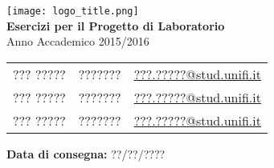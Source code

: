 \begin{center}
   	\texttt{[image: logo\_title.png]}\\[0.8cm]
    {\huge\bfseries Esercizi per il Progetto di Laboratorio}\\
    Anno Accademico 2015/2016\\[0.8cm]
	
    \begin{tabular*}{\linewidth}{lll}
        ??? \textsc{?????} & ???????  & \href{mailto:???.?????@stud.unifi.it}{???.?????@stud.unifi.it} \\
        ??? \textsc{?????} & ???????  &  \href{mailto:???.?????@stud.unifi.it}{???.?????@stud.unifi.it}\\
        ??? \textsc{?????} & ???????  & \href{mailto:???.?????@stud.unifi.it}{???.?????@stud.unifi.it}
    \end{tabular*}
    
    \begin{flushleft}
    	\textbf{Data di consegna:} ??/??/????\\[1.2cm]
    \end{flushleft}
\end{center}

